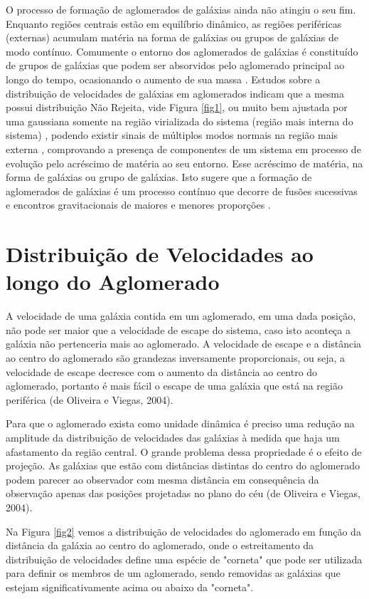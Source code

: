 O processo de formação de aglomerados de galáxias ainda não atingiu o seu fim. Enquanto regiões centrais estão em equilíbrio dinâmico, as regiões periféricas (externas) acumulam matéria na forma de galáxias ou grupos de galáxias de modo contínuo. Comumente o entorno dos aglomerados de galáxias é constituído de grupos de galáxias que podem ser absorvidos pelo aglomerado principal ao longo do tempo, ocasionando o aumento de sua massa \cite{rembold2011}. Estudos sobre a distribuição de velocidades de galáxias em aglomerados indicam que a mesma possui distribuição Não Rejeita, vide Figura \ref{fig1}, ou muito bem ajustada por uma gaussiana somente na região virializada do sistema (região mais interna do sistema) \cite{yahil1977velocity}, podendo existir sinais de múltiplos modos normais na região mais externa \cite{ribeiro2011non}, comprovando a presença de componentes de um sistema em processo de evolução pelo acréscimo de matéria ao seu entorno. Esse acréscimo de matéria, na forma de galáxias ou grupo de galáxias.  Isto sugere que a formação de aglomerados de galáxias é um processo contínuo que decorre de fusões sucessivas e encontros gravitacionais de maiores e menores proporções \cite{nascimento2016dynamical}.


\section{Distribuição de Velocidades ao longo do Aglomerado}
A velocidade de uma galáxia contida em um aglomerado, em uma dada posição, não pode ser maior que a velocidade de escape do sistema, caso isto aconteça a galáxia não pertenceria mais ao aglomerado. A velocidade de escape e a distância ao centro do aglomerado são grandezas inversamente proporcionais, ou seja, a velocidade de escape decresce com o aumento da distância ao centro do aglomerado, portanto é mais fácil o escape de uma galáxia que está na região periférica (de Oliveira e Viegas, 2004).

Para que o aglomerado exista como unidade dinâmica é preciso uma redução na amplitude da distribuição de velocidades das galáxias à medida que haja um afastamento da região central. O grande problema dessa propriedade é o efeito de projeção. As galáxias que estão com distâncias distintas do centro do aglomerado podem parecer ao observador com mesma distância em consequência da observação apenas das posições projetadas no plano do céu (de Oliveira e Viegas, 2004).

Na Figura \ref{fig2} vemos a distribuição de velocidades do aglomerado em função da distância da galáxia ao centro do aglomerado, onde o estreitamento da distribuição de velocidades define uma espécie de "corneta" que pode ser utilizada para definir os membros de um aglomerado, sendo removidas as galáxias que estejam significativamente acima ou abaixo da "corneta".

